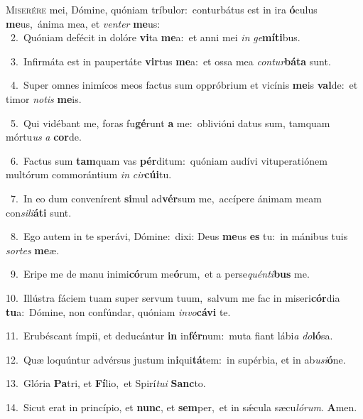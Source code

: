 \lettrine{\initial\textcolor{\initialcolor}{M}}{iserére} mei, Dómine, quóniam tríbulor:~\dagger conturbátus est in ira \textbf{ó}\-culus \textbf{me}\-us,~\star ánima mea, et \textit{ven}\-\textit{ter} \textbf{me}\-us:\\
{\numbfont\textcolor{\numbcolor}{~2.}}~Quóniam defécit in dolóre \textbf{vi}\-ta \textbf{me}\-a:~\star et anni mei \textit{in} \textit{ge}\-\textbf{mí}\textbf{ti}bus.\par
{\numbfont\textcolor{\numbcolor}{~3.}}~Infirmáta est in paupertáte \textbf{vir}\-tus \textbf{me}\-a:~\star et ossa mea \textit{con}\-\textit{tur}\textbf{bá}\textbf{ta} sunt.\par
{\numbfont\textcolor{\numbcolor}{~4.}}~Super omnes inimícos meos factus sum oppróbrium et vicínis \textbf{me}\-is \textbf{val}\-de:~\star et timor \textit{no}\-\textit{tis} \textbf{me}\-is.\par
{\numbfont\textcolor{\numbcolor}{~5.}}~Qui vidébant me, foras fu\-\textbf{gé}\-runt \textbf{a} me:~\star oblivióni datus sum, tamquam mórtu\textit{us} \textit{a} \textbf{cor}\-de.\par
{\numbfont\textcolor{\numbcolor}{~6.}}~Factus sum \textbf{tam}\-quam vas \textbf{pér}\-ditum:~\star quóniam audívi vituperatiónem multórum commorántium \textit{in} \textit{cir}\-\textbf{cú}\textbf{i}tu.\par
{\numbfont\textcolor{\numbcolor}{~7.}}~In eo dum convenírent \textbf{si}\-mul ad\-\textbf{vér}\-sum me,~\star accípere ánimam meam con\-\textit{si}\-\textit{li}\textbf{á}\textbf{ti} sunt.\par
{\numbfont\textcolor{\numbcolor}{~8.}}~Ego autem in te sperávi, Dómine:~\dagger dixi: Deus \textbf{me}\-us \textbf{es} tu:~\star in mánibus tuis \textit{sor}\-\textit{tes} \textbf{me}\-æ.\par
{\numbfont\textcolor{\numbcolor}{~9.}}~Eripe me de manu inimi\-\textbf{có}\-rum me\-\textbf{ó}\-rum,~\star et a perse\-\textit{quén}\-\textit{ti}\textbf{bus} me.\par
{\numbfont\textcolor{\numbcolor}{10.}}~Illústra fáciem tuam super servum tuum,~\dagger salvum me fac in miseri\-\textbf{cór}\-dia \textbf{tu}\-a:~\star Dómine, non confúndar, quóniam \textit{in}\-\textit{vo}\textbf{cá}\textbf{vi} te.\par
{\numbfont\textcolor{\numbcolor}{11.}}~Erubéscant ímpii, et deducántur \textbf{in} in\-\textbf{fér}\-num:~\star muta fiant lábi\textit{a} \textit{do}\-\textbf{ló}sa.\par
{\numbfont\textcolor{\numbcolor}{12.}}~Quæ loquúntur advérsus justum in\-\textbf{i}\-qui\-\textbf{tá}\-tem:~\star in supérbia, et in ab\-\textit{u}\-\textit{si}\textbf{ó}ne.\par
{\numbfont\textcolor{\numbcolor}{13.}}~Glória \textbf{Pa}\-tri, et \textbf{Fí}\-lio,~\star et Spirí\-\textit{tu}\-\textit{i} \textbf{Sanc}\-to.\par
{\numbfont\textcolor{\numbcolor}{14.}}~Sicut erat in princípio, et \textbf{nunc}\-, et \textbf{sem}\-per,~\star et in sǽcula sæcu\-\textit{ló}\-\textit{rum}. \textbf{A}\-men.\par
